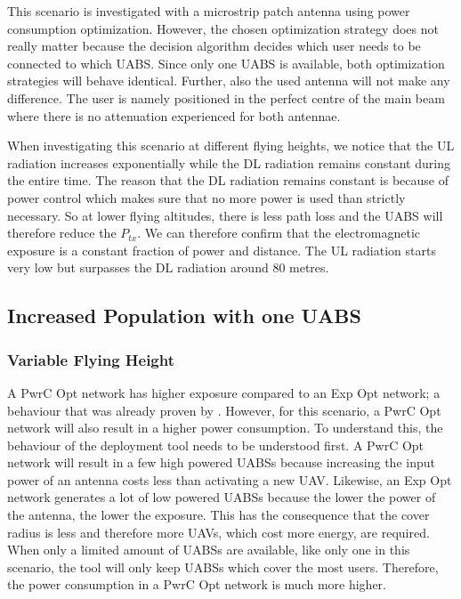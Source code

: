 \documentclass[twocolumn]{phdsymp} %
\begin{document}
This scenario is investigated with a microstrip patch antenna using power consumption optimization. 
 However, the chosen optimization strategy does not really matter because the decision 
 algorithm decides which user 
needs to be connected to which \gls{UABS}. Since only one \gls{UABS} is available, both optimization strategies will behave identical.
Further, also the used antenna will not make any difference.
The user is namely positioned in the perfect centre of the main beam where there is 
no attenuation experienced for both antennae.

When investigating this scenario at different flying heights, we notice 
that the \gls{UL} radiation 
increases exponentially while 
the \gls{DL} radiation remains constant during the entire time. The reason that the \gls{DL} radiation
remains constant is because of power control which makes sure that no more power is used than strictly necessary. 
So at lower flying altitudes, there is less path loss and the \gls{UABS} 
will therefore reduce the $P_{tx}$. 
We can therefore confirm that the electromagnetic exposure is a constant fraction of power and distance.
The \gls{UL} radiation starts very low but surpasses the \gls{DL} radiation 
around 80 metres.

\subsection{Increased Population with one UABS}
\subsubsection{Variable Flying Height}
A \gls{PwrC Opt} network has higher exposure compared to an \gls{Exp Opt} network; a behaviour that was already proven by \cite{J1}. 
However, for this scenario, a \gls{PwrC Opt} network will also result in a higher power consumption. 
To understand this, the behaviour of the deployment tool needs to be understood first. 
A \gls{PwrC Opt} network will result in a few high powered \gls{UABS}s because increasing the input power of an antenna costs 
less than activating a new  \gls{UAV}. Likewise, an \gls{Exp Opt} network 
generates a lot of low powered \gls{UABS}s because the lower the power of the antenna, the lower the exposure. This has the consequence that the cover radius 
is less and therefore more UAVs, which cost more energy, are required.
When only a limited amount of \gls{UABS}s are available, 
like only one in this scenario, the tool will only keep \gls{UABS}s which cover the most users. 
Therefore, the power consumption in a \gls{PwrC Opt} network is much more higher. 
\end{document}
